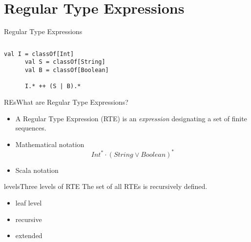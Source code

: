 \section{Regular Type Expressions}

\begin{frame}{Regular Type Expressions}
\end{frame}


\newsavebox\exnoteabbbox
\begin{lrbox}{\exnoteabbbox}
  \begin{minipage}{7cm}
    \begin{lstlisting}[style=scalaioScala]
    \end{lstlisting}
  \end{minipage}
\end{lrbox}

\newsavebox\exnotebox
\begin{lrbox}{\exnotebox}
  \begin{minipage}{7cm}
    \begin{lstlisting}[style=scalaioScala]
      val I = classOf[Int]
      val S = classOf[String]
      val B = classOf[Boolean]

      I.* ++ (S | B).*
    \end{lstlisting}
  \end{minipage}
\end{lrbox}


\begin{frame}{REs}{What are Regular Type Expressions?}
  \begin{itemize}
  \item A Regular Type Expression (RTE) is an \emph{expression} designating a set  of finite sequences.
  \item Mathematical notation
    \[Int^* \cdot (String \vee Boolean)^*\]
  \item Scala notation\\
    \usebox\exnotebox
  \end{itemize}
\end{frame}

\begin{frame}{levels}{Three levels of RTE}
  The set of all RTEs is recursively defined.
  \begin{itemize}
  \item leaf level
  \item recursive
  \item extended
  \end{itemize}
\end{frame}


